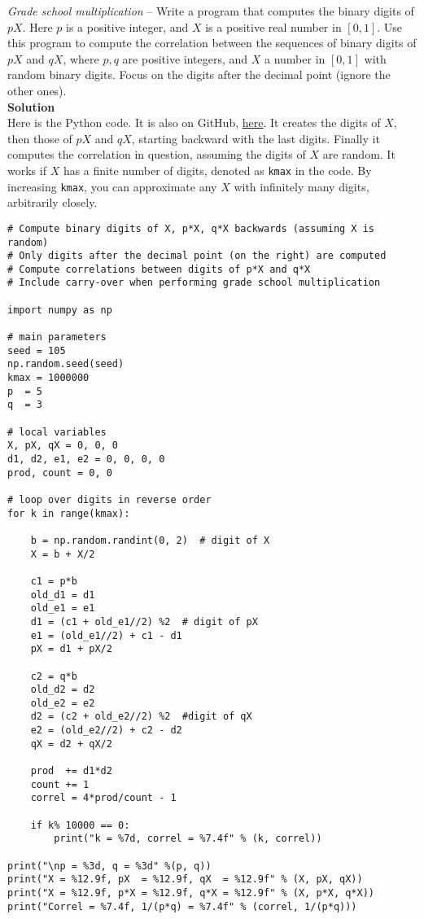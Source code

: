 \documentclass[oneside,10pt]{book}
\begin{document}
\begin{Exercise}\label{knoy55wc} {\em Grade school multiplication} -- Write a program that computes the binary digits of $pX$. Here $p$ is a positive integer, and $X$ is a positive real number in $[0, 1]$. Use this program to compute the correlation between the sequences of binary digits of $pX$ and $qX$, where $p,q$ are positive integers, and $X$ a number in $[0, 1]$ with random binary digits. Focus on the digits after the decimal point (ignore the other ones).
\vspace{1ex} \\ 
{\bf Solution} \\
Here is the Python code. It is also on GitHub, \href{https://github.com/VincentGranville/Stochastic-Processes/blob/master/lottery_correl.py}{here}. It creates the digits of $X$, then those of $pX$ and $qX$, starting backward with the last digits. Finally it computes the correlation in question, assuming the digits of $X$ are random. It works if $X$ has a finite number of digits, denoted as \texttt{kmax} in the code. By increasing \texttt{kmax}, you can approximate any $X$ with infinitely many digits, arbitrarily closely.
\end{Exercise}
\begin{lstlisting}
# Compute binary digits of X, p*X, q*X backwards (assuming X is random)
# Only digits after the decimal point (on the right) are computed
# Compute correlations between digits of p*X and q*X
# Include carry-over when performing grade school multiplication

import numpy as np

# main parameters
seed = 105
np.random.seed(seed)
kmax = 1000000
p  = 5
q  = 3

# local variables
X, pX, qX = 0, 0, 0
d1, d2, e1, e2 = 0, 0, 0, 0
prod, count = 0, 0 

# loop over digits in reverse order
for k in range(kmax): 

    b = np.random.randint(0, 2)  # digit of X
    X = b + X/2  

    c1 = p*b
    old_d1 = d1
    old_e1 = e1 
    d1 = (c1 + old_e1//2) %2  # digit of pX
    e1 = (old_e1//2) + c1 - d1
    pX = d1 + pX/2

    c2 = q*b
    old_d2 = d2
    old_e2 = e2 
    d2 = (c2 + old_e2//2) %2  #digit of qX
    e2 = (old_e2//2) + c2 - d2
    qX = d2 + qX/2

    prod  += d1*d2
    count += 1 
    correl = 4*prod/count - 1

    if k% 10000 == 0:  
        print("k = %7d, correl = %7.4f" % (k, correl))  

print("\np = %3d, q = %3d" %(p, q))
print("X = %12.9f, pX  = %12.9f, qX  = %12.9f" % (X, pX, qX))
print("X = %12.9f, p*X = %12.9f, q*X = %12.9f" % (X, p*X, q*X))    
print("Correl = %7.4f, 1/(p*q) = %7.4f" % (correl, 1/(p*q))) 
\end{lstlisting}
\end{document}
